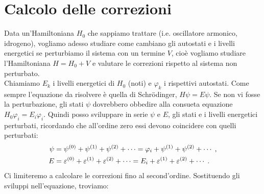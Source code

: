 \documentclass[12pt,a4paper]{report}
\theoremstyle{definition}
\numberwithin{equation}{section}
\newcommand{\Sch}{Schrödinger}
\begin{document}
\section{Calcolo delle correzioni}
Data un'Hamiltoniana $H_0$ che sappiamo trattare (i.e. oscillatore armonico, idrogeno), vogliamo adesso studiare come cambiano gli autostati e i livelli energetici se perturbiamo il sistema con un termine $V$, cioè vogliamo studiare l'Hamiltoniana $H=H_0+V$ e valutare le correzioni rispetto al sistema non perturbato. \\
Chiamiamo $E_k$ i livelli energetici di $H_0$ (noti) e $\varphi_k$ i rispettivi autostati. Come sempre l'equazione da risolvere è quella di \Sch, $H\psi=E\psi$. Se non vi fosse la perturbazione, gli stati $\psi$ dovrebbero obbedire alla consueta equazione $H_0\varphi_i=E_i\varphi_i$. Quindi posso sviluppare in serie $\psi$ e $E$, gli stati e i livelli energetici perturbati, ricordando che all'ordine zero essi devono coincidere con quelli perturbati:
\begin{align}
\psi&=\psi^{(0)}+\psi^{(1)}+\psi^{(2)}+\cdots = \varphi_i+\psi^{(1)}+\psi^{(2)}+\cdots\;, \notag \\
E &= \varepsilon^{(0)}+\varepsilon^{(1)}+\varepsilon^{(2)}+\cdots=E_i+\varepsilon^{(1)}+\varepsilon^{(2)}+\cdots\;.
\end{align} 
Ci limiteremo a calcolare le correzioni fino al second'ordine. Sostituendo gli sviluppi nell'equazione, troviamo:
\end{document}
